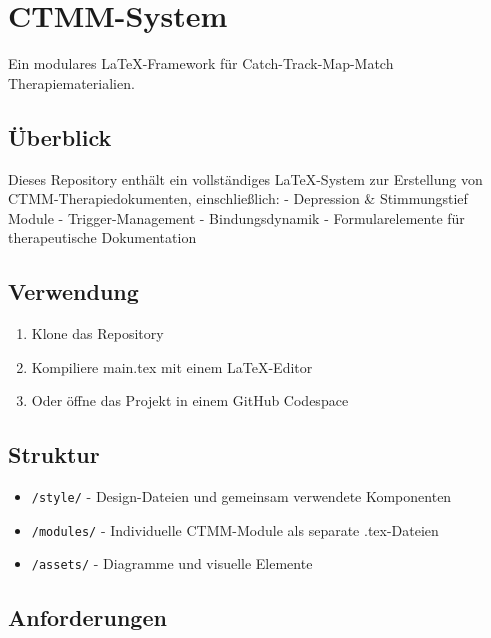 \hypertarget{ctmm-system}{%
\section{CTMM-System}\label{ctmm-system}}

Ein modulares LaTeX-Framework für Catch-Track-Map-Match Therapiematerialien.

\hypertarget{uxfcberblick}{%
\subsection{Überblick}\label{uxfcberblick}}

Dieses Repository enthält ein vollständiges LaTeX-System zur Erstellung von CTMM-Therapiedokumenten, einschließlich: - Depression \& Stimmungstief Module - Trigger-Management - Bindungsdynamik - Formularelemente für therapeutische Dokumentation

\hypertarget{verwendung}{%
\subsection{Verwendung}\label{verwendung}}

\begin{enumerate}
\def\labelenumi{\arabic{enumi}.}
\tightlist
\item
  Klone das Repository
\item
  Kompiliere main.tex mit einem LaTeX-Editor
\item
  Oder öffne das Projekt in einem GitHub Codespace
\end{enumerate}

\hypertarget{struktur}{%
\subsection{Struktur}\label{struktur}}

\begin{itemize}
\tightlist
\item
  \texttt{/style/} - Design-Dateien und gemeinsam verwendete Komponenten
\item
  \texttt{/modules/} - Individuelle CTMM-Module als separate .tex-Dateien
\item
  \texttt{/assets/} - Diagramme und visuelle Elemente
\end{itemize}

\hypertarget{anforderungen}{%
\subsection{Anforderungen}\label{anforderungen}}

